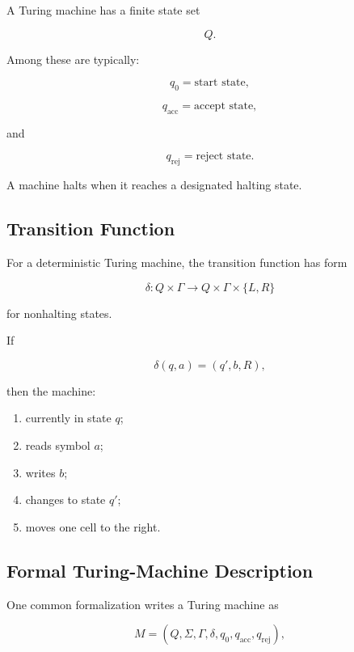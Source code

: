 A Turing machine has a finite state set

\[
\boxed{
Q.
}
\]

Among these are typically:

\[
\boxed{
q_0
=
\text{start state},
}
\]

\[
\boxed{
q_{\mathrm{acc}}
=
\text{accept state},
}
\]

and

\[
\boxed{
q_{\mathrm{rej}}
=
\text{reject state}.
}
\]

A machine halts when it reaches a designated halting state.

\subsection{Transition Function}
\label{subsec:turing-transition-function}

For a deterministic Turing machine, the transition function has form

\[
\boxed{
\delta:
Q\times\Gamma
\longrightarrow
Q\times\Gamma\times\{L,R\}
}
\]

for nonhalting states.

If

\[
\delta(q,a)
=
(q',b,R),
\]

then the machine:

\begin{enumerate}
    \item currently in state \(q\);
    \item reads symbol \(a\);
    \item writes \(b\);
    \item changes to state \(q'\);
    \item moves one cell to the right.
\end{enumerate}

\subsection{Formal Turing-Machine Description}
\label{subsec:formal-turing-machine}

One common formalization writes a Turing machine as

\[
\boxed{
M
=
(Q,\Sigma,\Gamma,\delta,q_0,q_{\mathrm{acc}},q_{\mathrm{rej}}),
}
\]

